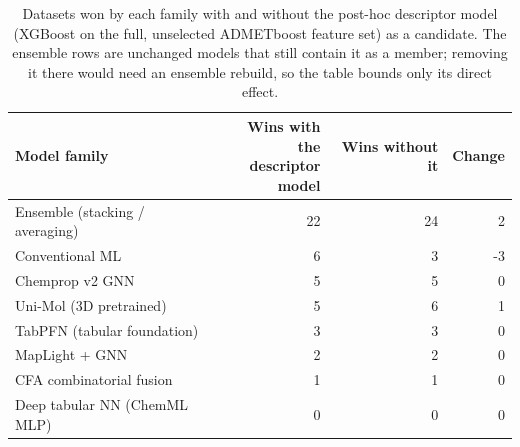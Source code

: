 \begin{table}[htbp]
\centering
\footnotesize
\caption{Datasets won by each family with and without the post-hoc descriptor model (XGBoost on the full, unselected ADMETboost feature set) as a candidate. The ensemble rows are unchanged models that still contain it as a member; removing it there would need an ensemble rebuild, so the table bounds only its direct effect.}
\label{tab:s14}
\begin{tabularx}{\textwidth}{@{}>{\raggedright\arraybackslash}Xrrr@{}}
\toprule
\textbf{Model family} & \makecell[r]{\textbf{Wins with the}\\\textbf{descriptor}\\\textbf{model}} & \textbf{Wins without it} & \textbf{Change} \\
\midrule
Ensemble (stacking /\allowbreak{} averaging) & 22 & 24 & 2 \\
Conventional ML & 6 & 3 & -\allowbreak{}3 \\
Chemprop v2 GNN & 5 & 5 & 0 \\
Uni-\allowbreak{}Mol (3D pretrained) & 5 & 6 & 1 \\
TabPFN (tabular foundation) & 3 & 3 & 0 \\
Map\allowbreak{}Light + GNN & 2 & 2 & 0 \\
CFA combinatorial fusion & 1 & 1 & 0 \\
Deep tabular NN (ChemML MLP) & 0 & 0 & 0 \\
\bottomrule
\end{tabularx}
\end{table}
